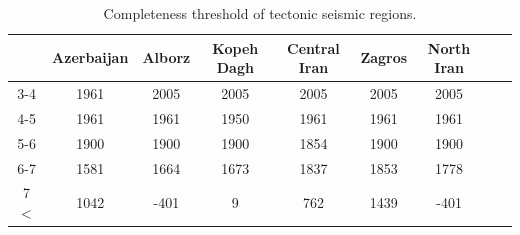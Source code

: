 \begin{table}[!ht]
\centering
\caption{Completeness threshold of tectonic seismic regions.}
\begin{tabular}{ccccccccc}
 ~           & Azerbaijan & Alborz & Kopeh Dagh & Central Iran & Zagros & North Iran  \\ \hline
3-4         & 1961          & 2005   & 2005             & 2005            & 2005    & 2005          \\ \hline
4-5         & 1961          & 1961   & 1950             & 1961            & 1961    & 1961          \\ \hline
5-6         & 1900          & 1900   & 1900             & 1854            & 1900    & 1900           \\ \hline
6-7         & 1581          & 1664   & 1673             & 1837            & 1853    & 1778           \\ \hline
7 $< $    & 1042          & -401    & 9                   & 762              & 1439    & -401            \\ 
\end{tabular}
\label{tab:completeness}
\end{table}














